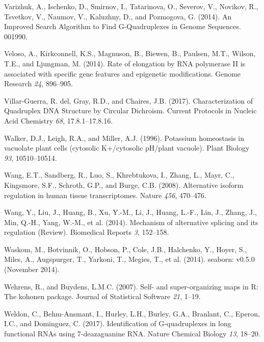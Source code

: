 \documentclass[12pt,a4paper,]{report}
\begin{document}
\leavevmode\hypertarget{ref-Varizhuk2014}{}%
Varizhuk, A., Ischenko, D., Smirnov, I., Tatarinova, O., Severov, V.,
Novikov, R., Tsvetkov, V., Naumov, V., Kaluzhny, D., and Pozmogova, G.
(2014). An Improved Search Algorithm to Find G-Quadruplexes in Genome
Sequences. 001990.

\leavevmode\hypertarget{ref-Veloso2014}{}%
Veloso, A., Kirkconnell, K.S., Magnuson, B., Biewen, B., Paulsen, M.T.,
Wilson, T.E., and Ljungman, M. (2014). Rate of elongation by RNA
polymerase II is associated with specific gene features and epigenetic
modifications. Genome Research \emph{24}, 896--905.

\leavevmode\hypertarget{ref-DelVillar-Guerra2017}{}%
Villar-Guerra, R. del, Gray, R.D., and Chaires, J.B. (2017).
Characterization of Quadruplex DNA Structure by Circular Dichroism.
Current Protocols in Nucleic Acid Chemistry \emph{68}, 17.8.1--17.8.16.

\leavevmode\hypertarget{ref-Walker1996}{}%
Walker, D.J., Leigh, R.A., and Miller, A.J. (1996). Potassium
homeostasis in vacuolate plant cells (cytosolic K+/cytosolic pH/plant
vacuole). Plant Biology \emph{93}, 10510--10514.

\leavevmode\hypertarget{ref-Wang2008}{}%
Wang, E.T., Sandberg, R., Luo, S., Khrebtukova, I., Zhang, L., Mayr, C.,
Kingsmore, S.F., Schroth, G.P., and Burge, C.B. (2008). Alternative
isoform regulation in human tissue transcriptomes. Nature \emph{456},
470--476.

\leavevmode\hypertarget{ref-Wang2015}{}%
Wang, Y., Liu, J., Huang, B., Xu, Y.-M., Li, J., Huang, L.-F., Lin, J.,
Zhang, J., Min, Q.-H., Yang, W.-M., et al. (2014). Mechanism of
alternative splicing and its regulation (Review). Biomedical Reports
\emph{3}, 152--158.

\leavevmode\hypertarget{ref-Waskom2014}{}%
Waskom, M., Botvinnik, O., Hobson, P., Cole, J.B., Halchenko, Y., Hoyer,
S., Miles, A., Augspurger, T., Yarkoni, T., Megies, T., et al. (2014).
seaborn: v0.5.0 (November 2014).

\leavevmode\hypertarget{ref-Wehrens2007}{}%
Wehrens, R., and Buydens, L.M.C. (2007). Self- and super-organizing maps
in R: The kohonen package. Journal of Statistical Software \emph{21},
1--19.

\leavevmode\hypertarget{ref-Weldon2017}{}%
Weldon, C., Behm-Ansmant, I., Hurley, L.H., Burley, G.A., Branlant, C.,
Eperon, I.C., and Dominguez, C. (2017). Identification of G-quadruplexes
in long functional RNAs using 7-deazaguanine RNA. Nature Chemical
Biology \emph{13}, 18--20.
\end{document}
